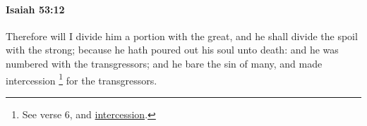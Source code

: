 
		\paragraph{Isaiah 53:12} %
			\label{ISAIAH-53-12}

			Therefore will I divide him a portion with the great, and he shall divide the spoil with the strong; because he hath poured out his soul unto death: and he was numbered with the transgressors; and he bare the sin of many, and made intercession%
				\footnote{%
					\label{ISAIAH-53-12-NOTE-intercession}%
					See verse 6, and \hyperref[INTERCESSION]{intercession}.
					}
			for the transgressors.

			\begin{framed}
			\scriptsize
				\begin{compactdesc}
					\item[LXX]  \hyperref[PSUCHE]{} 
				\end{compactdesc}
			\end{framed}
